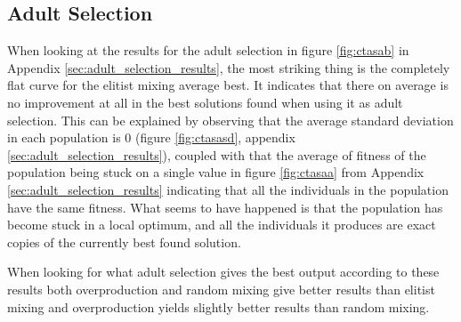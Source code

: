 
\subsection{Adult Selection} %
\label{sub:adult_selection}

When looking at the results for the adult selection in figure \ref{fig:ctasab} in Appendix \ref{sec:adult_selection_results}, the most striking thing is the completely flat curve for the elitist mixing average best. It indicates that there on average is no improvement at all in the best solutions found when using it as adult selection. This can be explained by observing that the average standard deviation in each population is 0 (figure \ref{fig:ctasasd}, appendix \ref{sec:adult_selection_results}), coupled with that the average of fitness of the population being stuck on a single value in figure \ref{fig:ctasaa} from Appendix \ref{sec:adult_selection_results} indicating that all the individuals in the population have the same fitness. What seems to have happened is that the population has become stuck in a local optimum, and all the individuals it produces are exact copies of the currently best found solution.

When looking for what adult selection gives the best output according to these results both overproduction and random mixing give better results than elitist mixing and overproduction yields slightly better results than random mixing.




